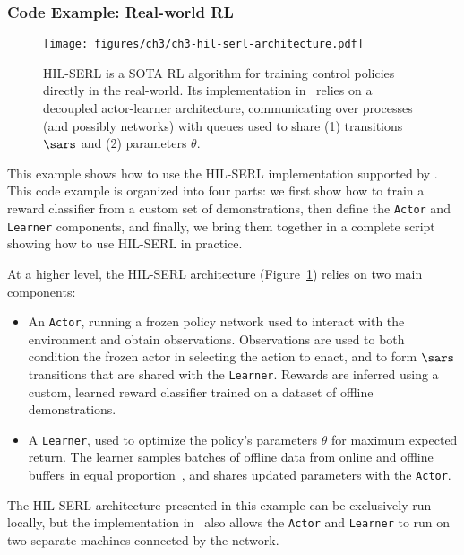 \subsubsection{Code Example: Real-world RL}

\begin{figure}
    \centering
    \texttt{[image: figures/ch3/ch3-hil-serl-architecture.pdf]}
    \caption{HIL-SERL is a SOTA RL algorithm for training control policies directly in the real-world. Its implementation in \lerobot~relies on a decoupled actor-learner architecture, communicating over processes (and possibly networks) with queues used to share (1) transitions \( \sars \) and (2) parameters \( \theta \).}
    \label{fig:ch3-hil-serl-architecture}
\end{figure}

This example shows how to use the HIL-SERL implementation supported by \lerobot.
This code example is organized into four parts: we first show how to train a reward classifier from a custom set of demonstrations, then define the \texttt{Actor} and \texttt{Learner} components, and finally, we bring them together in a complete script showing how to use HIL-SERL in practice.

At a higher level, the HIL-SERL architecture (Figure~\ref{fig:ch3-hil-serl-architecture}) relies on two main components:
\begin{itemize}
    \item An \texttt{Actor}, running a frozen policy network used to interact with the environment and obtain observations. Observations are used to both condition the frozen actor in selecting the action to enact, and to form \( \sars \) transitions that are shared with the \texttt{Learner}. Rewards are inferred using a custom, learned reward classifier trained on a dataset of offline demonstrations.
    \item A \texttt{Learner}, used to optimize the policy's parameters \( \theta \) for maximum expected return. The learner samples batches of offline data from online and offline buffers in equal proportion~\citep{ballEfficientOnlineReinforcement2023}, and shares updated parameters with the \texttt{Actor}.
\end{itemize}

The HIL-SERL architecture presented in this example can be exclusively run locally, but the implementation in \lerobot~also allows the \texttt{Actor} and \texttt{Learner} to run on two separate machines connected by the network.


